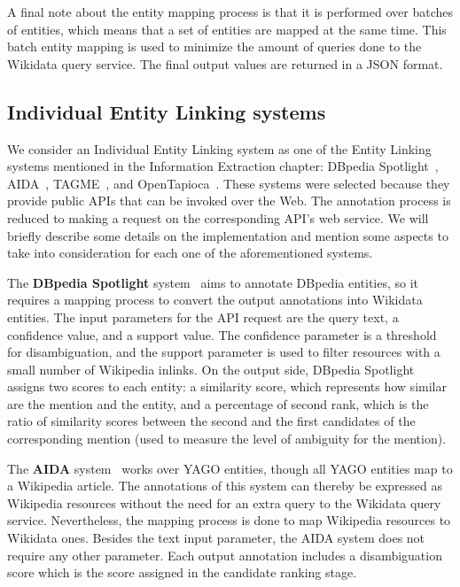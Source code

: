 A final note about the entity mapping process is that it is performed over batches of entities, 
which means that a set of entities are mapped at the same time. This batch entity mapping is 
used to minimize the amount of queries done to the Wikidata query service. The final output 
values are returned in a JSON format.

\subsection{Individual Entity Linking systems}
We consider an Individual Entity Linking system as one of the Entity Linking systems mentioned 
in the Information Extraction chapter: DBpedia Spotlight~\cite{EL:dbpedia-spotlight-MendesJGB11}, 
AIDA~\cite{EL:aida-tool-YosefHBSW11, EL:aida-HoffartYBFPSTTW11}, TAGME~\cite{EL:tagme-FerraginaS10}, 
and OpenTapioca~\cite{EL:opentapioca-Delpeuch19}. These systems were selected because they 
provide public APIs that can be invoked over the Web. The annotation process is reduced to 
making a request on the corresponding API’s web service. We will briefly describe some details 
on the implementation and mention some aspects to take into consideration for each one of the 
aforementioned systems.

The \textbf{DBpedia Spotlight} system~\cite{EL:dbpedia-spotlight-MendesJGB11} aims to 
annotate DBpedia entities, so it requires a mapping process to convert the output annotations 
into Wikidata entities. The input parameters for the API request are the query text, a 
confidence value, and a support value. The confidence parameter is a threshold for disambiguation, 
and the support parameter is used to filter resources with a small number of Wikipedia 
inlinks. On the output side, DBpedia Spotlight assigns two scores to each entity: a 
similarity score, which represents how similar are the mention and the entity, and a 
percentage of second rank, which is the ratio of similarity scores between the second and the 
first candidates of the corresponding mention (used to measure the level of ambiguity for the 
mention).

The \textbf{AIDA} system~\cite{EL:aida-tool-YosefHBSW11, EL:aida-HoffartYBFPSTTW11} works over 
YAGO entities, though all YAGO entities map to a Wikipedia article. The annotations of this 
system can thereby be expressed as Wikipedia resources without the need for an extra query to 
the Wikidata query service. Nevertheless, the mapping process is done to map Wikipedia resources 
to Wikidata ones. Besides the text input parameter, the AIDA system does not require any other 
parameter. Each output annotation includes a disambiguation score which is the score assigned 
in the candidate ranking stage.

